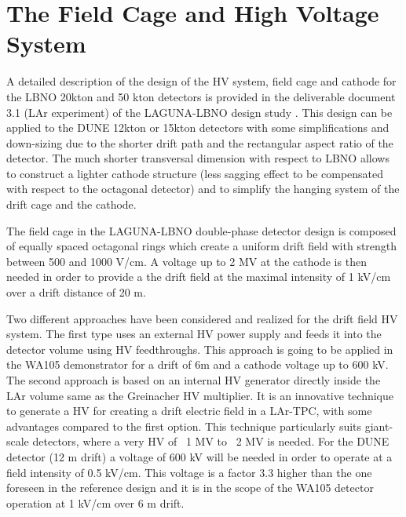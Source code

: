 \section{The Field Cage and High Voltage System} 
\label{sec:detectors-fd-alt-hv}

A detailed description of the design of the HV system, field cage and cathode for the LBNO 20kton and 50 kton detectors is provided in the deliverable document 3.1 (LAr experiment) of the LAGUNA-LBNO design study \cite{LAGUNA-LBNO-deliv}. This design can be applied to the DUNE 12kton or 15kton detectors with some simplifications and down-sizing due to the shorter drift path and the rectangular aspect ratio of the detector. The much shorter transversal dimension with respect to LBNO allows to construct a lighter cathode structure (less sagging effect to be compensated with respect to the octagonal detector) and to simplify the hanging system of the drift cage and the cathode.

The field cage in the LAGUNA-LBNO double-phase detector design  is composed of equally spaced octagonal rings which create a uniform drift field with strength between 500 and 1000 V/cm. A  voltage up to 2 MV at the cathode is then needed in order to provide a the drift field at the maximal intensity of 1 kV/cm over a drift distance of 20 m.

Two different approaches have been considered and realized for the drift field HV system. The first type uses an external HV power supply and feeds it into the detector volume using HV feedthroughs. This approach is going to be applied in the WA105 demonstrator for a drift of 6m and a cathode voltage up to 600 kV.  The second approach is based on an internal HV generator directly inside the LAr volume same as the Greinacher HV multiplier. It is an innovative technique to generate a HV for creating a drift electric field in a LAr-TPC, with some advantages compared to the first option. This technique particularly suits giant-scale detectors, where a very HV of ~1 MV to ~2 MV is needed. For the DUNE detector (12 m drift) a voltage of 600 kV will be needed in order to operate at a field intensity of 0.5 kV/cm. This voltage is a factor 3.3 higher than the one foreseen in the reference design and it is in the scope of the WA105 detector operation at 1 kV/cm over 6 m drift.

